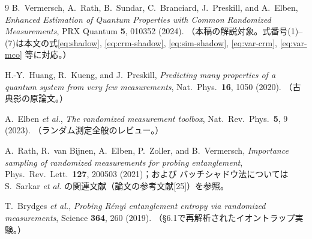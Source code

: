 \documentclass[11pt]{ltjsarticle}
\begin{document}
\begin{thebibliography}{9}
B.~Vermersch, A.~Rath, B.~Sundar, C.~Branciard, J.~Preskill, and A.~Elben,
\emph{Enhanced Estimation of Quantum Properties with Common Randomized Measurements},
PRX Quantum \textbf{5}, 010352 (2024).
（本稿の解説対象。式番号(1)--(7)は本文の式\eqref{eq:shadow}, \eqref{eq:crm-shadow},
\eqref{eq:sim-shadow}, \eqref{eq:var-crm}, \eqref{eq:var-mco} 等に対応。）

H.-Y.~Huang, R.~Kueng, and J.~Preskill,
\emph{Predicting many properties of a quantum system from very few measurements},
Nat.\ Phys.\ \textbf{16}, 1050 (2020).
（古典影の原論文。）

A.~Elben \textit{et al.},
\emph{The randomized measurement toolbox},
Nat.\ Rev.\ Phys.\ \textbf{5}, 9 (2023).
（ランダム測定全般のレビュー。）

A.~Rath, R.~van Bijnen, A.~Elben, P.~Zoller, and B.~Vermersch,
\emph{Importance sampling of randomized measurements for probing entanglement},
Phys.\ Rev.\ Lett.\ \textbf{127}, 200503 (2021)；および
バッチシャドウ法については
S.~Sarkar \textit{et al.} の関連文献（論文の参考文献[25]）を参照。

T.~Brydges \textit{et al.},
\emph{Probing Rényi entanglement entropy via randomized measurements},
Science \textbf{364}, 260 (2019).
（\S6.1で再解析されたイオントラップ実験。）
\end{thebibliography}
\end{document}
